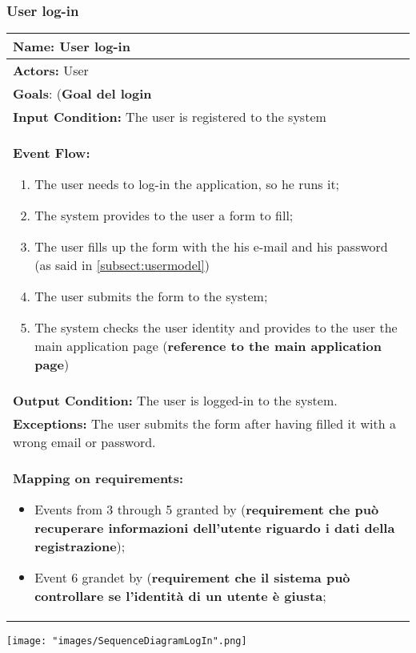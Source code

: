 \subsubsection{User log-in}
\begin{tabular}{|p{14cm}|} \hline

\textbf{Name:} User log-in \\ \hline
\textbf{Actors:} User \\ \hline
\textbf{Goals}: (\textbf{Goal del login} \\ \hline
\textbf{Input Condition:} The user is registered to the system \\ \hline
\textbf{Event Flow:} 
\begin{enumerate}
\item The user needs to log-in the application, so he runs it;
\item The system provides to the user a form to fill;
\item The user fills up the form with the his e-mail and his password (as said in \ref{subsect:usermodel})
\item The user submits the form to the system;
\item The system checks the user identity and provides to the user the main application page (\textbf{reference to the main application page})
\end{enumerate} \\ \hline

\textbf{Output Condition:} The user is logged-in to the system. \\ \hline

\textbf{Exceptions:} The user submits the form after having filled it with a wrong email or password. \\ \hline

\textbf{Mapping on requirements:}
\begin{itemize}
\item Events from 3 through 5 granted by (\textbf{requirement che può recuperare informazioni dell'utente riguardo i dati della registrazione});
\item Event 6 grandet by (\textbf{requirement che il sistema può controllare se l'identità di un utente è giusta};
\end{itemize} \\ \hline

\end{tabular}

\texttt{[image: "images/SequenceDiagramLogIn".png]}

